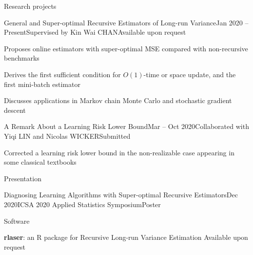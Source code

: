 \documentclass[10pt]{resume} %
\begin{document}
\begin{rSection}{Research projects}

\begin{rSubsection}{General and Super-optimal Recursive Estimators of Long-run Variance}{Jan 2020 -- Present}{Supervised by Kin Wai CHAN}{Available upon request}
\item Proposes online estimators with super-optimal MSE compared with non-recursive benchmarks
\item Derives the first sufficient condition for $O(1)$-time or space update, and the first mini-batch estimator
\item Discusses applications in Markov chain Monte Carlo and stochastic gradient descent
\end{rSubsection}


\begin{rSubsection}{A Remark About a Learning Risk Lower Bound}{Mar -- Oct 2020}{Collaborated with Yiqi LIN and Nicolas WICKER}{Submitted}
\item Corrected a learning risk lower bound in the non-realizable case appearing in some classical textbooks
\end{rSubsection}

\end{rSection}


\begin{rSection}{Presentation}

\begin{rSubsection}{Diagnosing Learning Algorithms with Super-optimal Recursive Estimators}{Dec 2020}{ICSA 2020 Applied Statistics Symposium}{Poster}
\end{rSubsection}

\end{rSection}


\begin{rSection}{Software}

\textbf{rlaser}: an R package for Recursive Long-run Variance Estimation \hfill {Available upon request}

\end{rSection}
\end{document}
